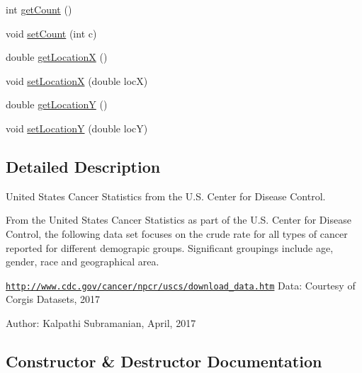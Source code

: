 \begin{DoxyCompactItemize}
\item 
int \hyperlink{classbridges_1_1data__src__dependent_1_1_cancer_incidence_a8769cb18ddb590dc41a04a220174f3df}{get\+Count} ()
\item 
void \hyperlink{classbridges_1_1data__src__dependent_1_1_cancer_incidence_a18099439ef6e35cf240b06f0e0158c72}{set\+Count} (int c)
\item 
double \hyperlink{classbridges_1_1data__src__dependent_1_1_cancer_incidence_a24aa8144dcacd93a26c3c033471666df}{get\+Location\+X} ()
\item 
void \hyperlink{classbridges_1_1data__src__dependent_1_1_cancer_incidence_a384149c413173fba51adad1b1769797a}{set\+Location\+X} (double loc\+X)
\item 
double \hyperlink{classbridges_1_1data__src__dependent_1_1_cancer_incidence_a53b56a9931a1d02ee356c6258e245aa8}{get\+Location\+Y} ()
\item 
void \hyperlink{classbridges_1_1data__src__dependent_1_1_cancer_incidence_a14c6921a71834c14d561bc7f2aa8a18e}{set\+Location\+Y} (double loc\+Y)
\end{DoxyCompactItemize}


\subsection{Detailed Description}
United States Cancer Statistics from the U.\+S. Center for Disease Control. 

From the United States Cancer Statistics as part of the U.\+S. Center for Disease Control, the following data set focuses on the crude rate for all types of cancer reported for different demograpic groups. Significant groupings include age, gender, race and geographical area.

\href{http://www.cdc.gov/cancer/npcr/uscs/download_data.htm}{\tt http\+://www.\+cdc.\+gov/cancer/npcr/uscs/download\+\_\+data.\+htm} Data\+: Courtesy of Corgis Datasets, 2017

Author\+: Kalpathi Subramanian, April, 2017 

\subsection{Constructor \& Destructor Documentation}
\hypertarget{classbridges_1_1data__src__dependent_1_1_cancer_incidence_a92db1eb4292c77f07619019587caf5cc}{}
